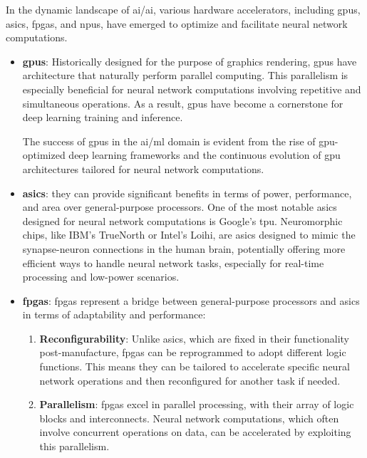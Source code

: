 In the dynamic landscape of \gls{ai}/\gls{ai}, various hardware accelerators, including \glspl{gpu}, \glspl{asic}, \glspl{fpga}, and \glspl{npu}, have emerged to optimize and facilitate neural network computations.
\begin{itemize}
	\item \textbf{\glspl{gpu}}: Historically designed for the purpose of graphics rendering, \glspl{gpu} have architecture that naturally perform parallel computing. This parallelism is especially beneficial for neural network computations involving repetitive and simultaneous operations. As a result, \glspl{gpu} have become a cornerstone for deep learning training and inference.
	
	The success of \glspl{gpu} in the \gls{ai}/\gls{ml} domain is evident from the rise of \gls{gpu}-optimized deep learning frameworks and the continuous evolution of \gls{gpu} architectures tailored for neural network computations.
	
	
	\item \textbf{\glspl{asic}}: they can provide significant benefits in terms of power, performance, and area over general-purpose processors. One of the most notable \glspl{asic} designed for neural network computations is Google's \gls{tpu}. Neuromorphic chips, like IBM's TrueNorth or Intel's Loihi, are \glspl{asic} designed to mimic the synapse-neuron connections in the human brain, potentially offering more efficient ways to handle neural network tasks, especially for real-time processing and low-power scenarios.
	
	\item \textbf{\glspl{fpga}}: \glspl{fpga} represent a bridge between general-purpose processors and \glspl{asic} in terms of adaptability and performance:
	
	\begin{enumerate}
		\item \textbf{Reconfigurability}: Unlike \glspl{asic}, which are fixed in their functionality post-manufacture, \glspl{fpga} can be reprogrammed to adopt different logic functions. This means they can be tailored to accelerate specific neural network operations and then reconfigured for another task if needed.
		
		\item \textbf{Parallelism}: \glspl{fpga} excel in parallel processing, with their array of logic blocks and interconnects. Neural network computations, which often involve concurrent operations on data, can be accelerated by exploiting this parallelism.
		

\end{enumerate}
\end{itemize}
